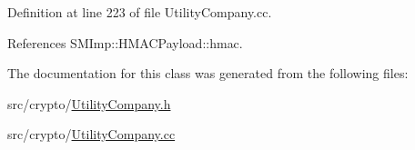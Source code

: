 Definition at line 223 of file Utility\+Company.\+cc.



References S\+M\+Imp\+::\+H\+M\+A\+C\+Payload\+::hmac.



The documentation for this class was generated from the following files\+:\begin{DoxyCompactItemize}
\item 
src/crypto/\hyperlink{crypto_2UtilityCompany_8h}{Utility\+Company.\+h}\item 
src/crypto/\hyperlink{crypto_2UtilityCompany_8cc}{Utility\+Company.\+cc}\end{DoxyCompactItemize}
